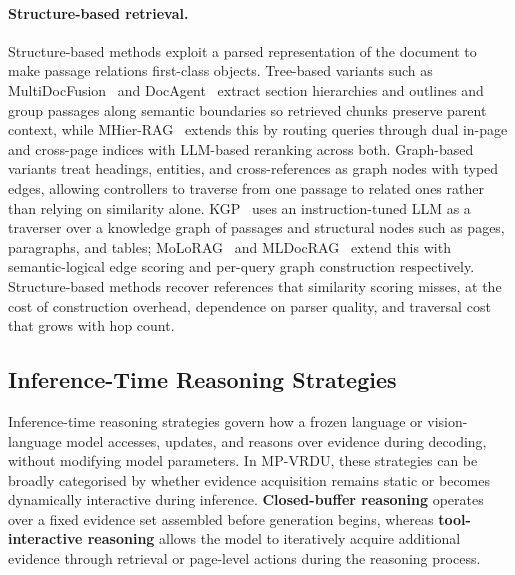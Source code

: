 \documentclass[11pt]{article}
\begin{document}
\paragraph{Structure-based retrieval.} Structure-based methods exploit a parsed representation of the document to make passage relations first-class objects. Tree-based variants such as MultiDocFusion~\cite{shin2025multidocfusion} and DocAgent~\cite{sun2025docagent} extract section hierarchies and outlines and group passages along semantic boundaries so retrieved chunks preserve parent context, while MHier-RAG~\cite{gong2025mhierrag} extends this by routing queries through dual in-page and cross-page indices with LLM-based reranking across both. Graph-based variants treat headings, entities, and cross-references as graph nodes with typed edges, allowing controllers to traverse from one passage to related ones rather than relying on similarity alone. KGP~\cite{wang2024knowledge} uses an instruction-tuned LLM as a traverser over a knowledge graph of passages and structural nodes such as pages, paragraphs, and tables; MoLoRAG~\cite{wu2025molorag} and MLDocRAG~\cite{zhang2026mldocrag} extend this with semantic-logical edge scoring and per-query graph construction respectively. Structure-based methods recover references that similarity scoring misses, at the cost of construction overhead, dependence on parser quality, and traversal cost that grows with hop count.

\subsection{Inference-Time Reasoning Strategies}
\label{sec:tf-reasoning}

Inference-time reasoning strategies govern how a frozen language or vision-language model accesses, updates, and reasons over evidence during decoding, without modifying model parameters. In MP-VRDU, these strategies can be broadly categorised by whether evidence acquisition remains static or becomes dynamically interactive during inference. \textbf{Closed-buffer reasoning} operates over a fixed evidence set assembled before generation begins, whereas \textbf{tool-interactive reasoning} allows the model to iteratively acquire additional evidence through retrieval or page-level actions during the reasoning process.
\end{document}
